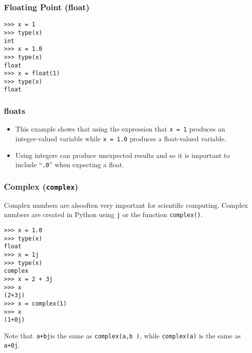 \documentclass[KSmainSlides.tex]{subfiles}
\begin{document}
\begin{frame}[fragile]
	\frametitle{Floating Point (float)}
\begin{framed}
\begin{verbatim}
>>> x = 1
>>> type(x)
int
>>> x = 1.0
>>> type(x)
float
>>> x = float(1)
>>> type(x)
float
\end{verbatim}
\end{framed}

\end{frame}
\begin{frame}[fragile]
	\frametitle{floats}
	\begin{itemize}
	\item This example shows that using the expression that \texttt{x = 1} produces an integer-valued variable while \texttt{x = 1.0}
	produces a float-valued variable. 
	\item Using integers can produce unexpected results and so it is important to
	include ``\texttt{.0}” when expecting a float.
	\end{itemize}


\end{frame}
\begin{frame}[fragile]
\frametitle{Complex (\texttt{complex})}

Complex numbers are alsooften very important for scientific computing. Complex numbers are created in Python
using \texttt{j} or the function \texttt{complex()}.
\begin{framed}
\begin{verbatim}
>>> x = 1.0
>>> type(x)
float
>>> x = 1j
>>> type(x)
complex
>>> x = 2 + 3j
>>> x
(2+3j)
>>> x = complex(1)
>>> x
(1+0j)
\end{verbatim}
\end{framed}

\end{frame}
\begin{frame}[fragile]
\noindent Note that\texttt{ a+bj}is the same as \texttt{complex(a,b )}, while \texttt{complex(a)} is the same as \texttt{a+0j}.


\end{frame}
\end{document}
